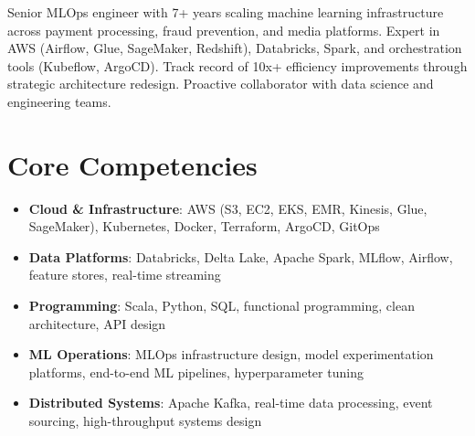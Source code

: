 \documentclass[11pt,a4paper,sans]{moderncv}
\begin{document}
\makecvtitle


\vspace{6pt}
\small{Senior MLOps engineer with 7+ years scaling machine learning infrastructure across payment processing, fraud prevention, and media platforms. Expert in AWS (Airflow, Glue, SageMaker, Redshift), Databricks, Spark, and orchestration tools (Kubeflow, ArgoCD). Track record of 10x+ efficiency improvements through strategic architecture redesign. Proactive collaborator with data science and engineering teams.}


\section{Core Competencies}
\vspace{1pt}
\begin{itemize}

\item \textbf{Cloud \& Infrastructure}: AWS (S3, EC2, EKS, EMR, Kinesis, Glue, SageMaker), Kubernetes, Docker, Terraform, ArgoCD, GitOps

\item \textbf{Data Platforms}: Databricks, Delta Lake, Apache Spark, MLflow, Airflow, feature stores, real-time streaming

\item \textbf{Programming}: Scala, Python, SQL, functional programming, clean architecture, API design

\item \textbf{ML Operations}: MLOps infrastructure design, model experimentation platforms, end-to-end ML pipelines, hyperparameter tuning

\item \textbf{Distributed Systems}: Apache Kafka, real-time data processing, event sourcing, high-throughput systems design

\end{itemize}

\end{document}
